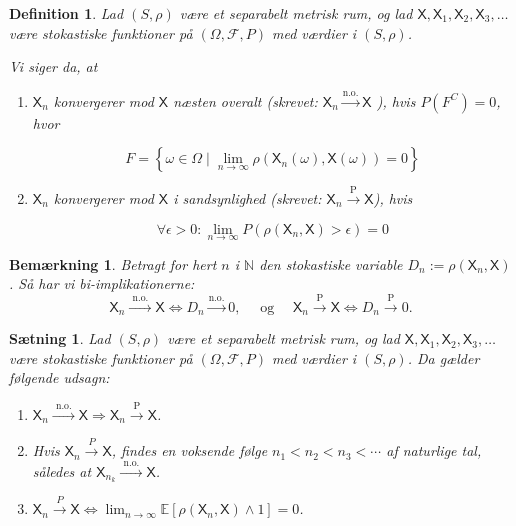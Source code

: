 \documentclass{article}
\newcommand{\1}{\mathbbm{1}}
\newcommand{\X}{\mathsf{X}}
\newtheorem{definition}[theorem]{Definition}
\newtheorem{remark}[theorem]{Bemærkning}
\newtheorem{proposition}[theorem]{Sætning}
\theoremstyle{boxed}
\begin{document}
\begin{theorem-box}
    \begin{definition}
        Lad $(S, \rho)$ være et separabelt metrisk rum, og lad $\X, \X_1, \X_2, \X_3, \ldots$ være stokastiske funktioner på $(\Omega, \mathcal{F}, P)$ med værdier i $(S, \rho)$.

Vi siger da, at
\begin{enumerate}
    \item[\textnormal{(a)}] $\X_n$ konvergerer mod $\X$ næsten overalt (skrevet: $\X_n \xrightarrow{\text{n.o.}} \X$ ), hvis $P(F^C)=0$, hvor

    $$
    F=\left\{\omega \in \Omega \mid \lim _{n \rightarrow \infty} \rho\left(\X_n(\omega), \X(\omega)\right)=0\right\}
    $$
    
    \item[\textnormal{(b)}] $\X_n$ konvergerer mod $\X$ i sandsynlighed (skrevet: $\X_n \xrightarrow{\mathrm{P}} \X$), hvis

    $$
    \forall \epsilon>0: \lim _{n \rightarrow \infty} P\left(\rho\left(\X_n, \X\right)>\epsilon\right)=0
    $$
\end{enumerate}
    \end{definition}
\end{theorem-box}
\begin{remark}
    Betragt for hert $n$ i $\mathbb{N}$ den stokastiske variable $D_n:=\rho\left(\X_n, \X\right)$. Så har vi bi-implikationerne:
$$
\X_n \xrightarrow{\text { n.o. }} \X \Longleftrightarrow D_n \xrightarrow{\text {n.o.}} 0, \quad \text { og } \quad \X_n \xrightarrow{\mathrm{P}} \X \Longleftrightarrow D_n \xrightarrow{\mathrm{P}} 0 .
$$

\end{remark}
\begin{theorem-box}
    \begin{proposition}
        Lad $(S, \rho)$ være et separabelt metrisk rum, og lad $\X, \X_1, \X_2, \X_3, \ldots$ være stokastiske funktioner på $(\Omega, \mathcal{F}, P)$ med værdier i $(S, \rho)$.
Da gælder følgende udsagn:
\begin{enumerate}
    \item[\textnormal{(i)}] $\X_n \xrightarrow{\text { n.o. }} \X \Longrightarrow \X_n \xrightarrow{\mathrm{P}} \X$.
    \item[\textnormal{(ii)}] Hvis $\X_n \xrightarrow{P} \X$, findes en voksende følge $n_1<n_2<n_3<\cdots$ af naturlige tal, således at $\X_{n_k} \xrightarrow{\text { n.o. }} \X$.
    \item[\textnormal{(iii)}] $\X_n \xrightarrow{P} \X \Longleftrightarrow \lim _{n \rightarrow \infty} \mathbb{E}\left[\rho\left(\X_n, \X\right) \wedge 1\right]=0$.

\end{enumerate}
    \end{proposition}
\end{theorem-box}
\end{document}
